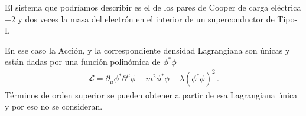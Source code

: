 El sistema que podríamos describir es el de los pares de Cooper de carga eléctrica $-2$ y dos veces la masa del electrón en el interior de un superconductor de Tipo-I.



\begin{frame}


En ese caso la Acción, y la correspondiente densidad Lagrangiana son
únicas y están dadas por una función polinómica de $\phi^{*}\phi$
\begin{align}
  \label{eq:41qftnew}
  \mathcal{L}=\partial_{\mu}\phi^{*} \partial^{\mu}\phi-m^2\phi^{*}\phi-\lambda \left(\phi^{*}\phi \right)^2\,.
\end{align}
Términos de orden superior se pueden obtener a partir de esa
Lagrangiana única y por eso no se consideran. 
\end{frame}

